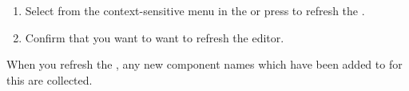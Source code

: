 
\begin{enumerate}
\item Select  from the context-sensitive menu in the \gdomeditor{} or press  to refresh the \gdomeditor{}. 
\item Confirm that you want to want to refresh the editor. 
\end{enumerate}

When you refresh the \gdomeditor{}, any new component names which have been added to \gdsuites{} for this \gdaut{} are collected. 


